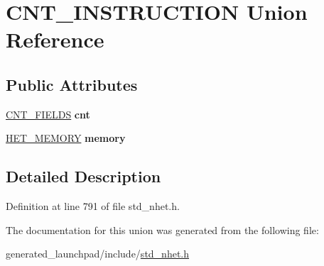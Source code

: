 \hypertarget{unionCNT__INSTRUCTION}{}\section{C\+N\+T\+\_\+\+I\+N\+S\+T\+R\+U\+C\+T\+I\+ON Union Reference}
\label{unionCNT__INSTRUCTION}
\subsection*{Public Attributes}
\begin{DoxyCompactItemize}
\item 
\mbox{\label{unionCNT__INSTRUCTION_afaf22221abad0b9f6ddd3724285221a8}} 
\mbox{\hyperlink{structCNT__format}{C\+N\+T\+\_\+\+F\+I\+E\+L\+DS}} {\bfseries cnt}
\item 
\mbox{\label{unionCNT__INSTRUCTION_ad29123d2f77dac21692d044f7024ca11}} 
\mbox{\hyperlink{structmemory__format}{H\+E\+T\+\_\+\+M\+E\+M\+O\+RY}} {\bfseries memory}
\end{DoxyCompactItemize}


\subsection{Detailed Description}


Definition at line 791 of file std\+\_\+nhet.\+h.



The documentation for this union was generated from the following file\+:\begin{DoxyCompactItemize}
\item 
generated\+\_\+launchpad/include/\mbox{\hyperlink{std__nhet_8h}{std\+\_\+nhet.\+h}}\end{DoxyCompactItemize}
